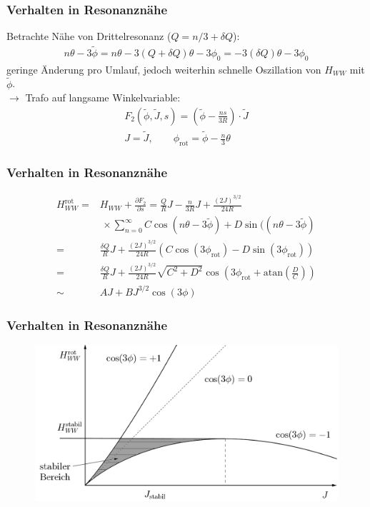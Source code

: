 \documentclass[hyperref={pdfpagelabels=false}]{beamer}
\begin{document}
\begin{frame}
 \frametitle{Verhalten in Resonanznähe}
 \pause
 Betrachte Nähe von Drittelresonanz ($Q = n/3 + \delta Q$):
 \begin{align*}
  n\theta - 3\tilde{\phi} = n \theta - 3(Q+\delta Q)\theta -3 \phi_0 = -3(\delta Q) \theta -3\phi_0
 \end{align*}
 geringe Änderung pro Umlauf, jedoch weiterhin schnelle Oszillation von $H_{WW}$ mit $\tilde {\phi}$. \\
 $\rightarrow$ Trafo auf langsame Winkelvariable:
 \begin{align*}
 F_2(\tilde{\phi},\tilde{J},s) = \left(\tilde{\phi} - \frac{ns}{3R}\right)\cdot \tilde{J}\\ 
 J=\tilde{J},\qquad \phi_\text{rot} = \tilde{\phi} - \frac{n}{3}\theta 
 \end{align*}

\end{frame}

\begin{frame}
 \frametitle{Verhalten in Resonanznähe}
 \pause
 \begin{align*}
  H_{WW}^\text{rot} =& H_{WW} + \frac{\partial F_2}{\partial s} = \frac{Q}{R}J -\frac{n}{3R}J + \frac{(2J)^{3/2}}{24R}\\
  &\,\times \sum\limits_{n=0}^\infty C \cos(n\theta - 3\tilde{\phi}) + D \sin((n\theta - 3\tilde{\phi})\\
  =& \frac{\delta Q}{R}J + \frac{(2J)^{3/2}}{24R}(C\cos(3\phi_\text{rot}) - D\sin(3\phi_\text{rot}))\\
  =& \frac{\delta Q}{R}J + \frac{(2J)^{3/2}}{24R}\sqrt{C^2+D^2}\cos\left(3\phi_\text{rot}+\text{atan}\left(\frac{D}{C}\right)\right)\\
  \sim& AJ + BJ^{3/2}\cos(3\phi)
 \end{align*}

\end{frame}

\begin{frame}
\frametitle{Verhalten in Resonanznähe}
\begin{figure}[H]
 \includegraphics[width=1\textwidth]{../pics/Hstabil.jpg}
\end{figure} 
\end{frame}
\end{document}
